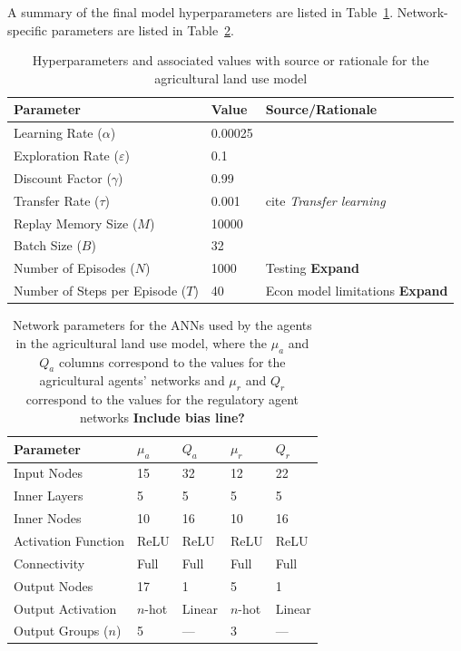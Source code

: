 A summary of the final model hyperparameters are listed in
Table~\ref{tab:farm_exp_hyper}.
Network-specific parameters are listed in Table~\ref{tab:farm_exp_nets}.

\begin{table}
\centering
\caption{Hyperparameters and associated values with source or rationale
    for the agricultural land use model}
\label{tab:farm_exp_hyper}
\begin{tabular}{lll}
\hline
Parameter & Value & Source/Rationale \\
\hline
    Learning Rate ($\alpha$) & 0.00025 & \\
    Exploration Rate ($\varepsilon$) & 0.1 & \\
    Discount Factor ($\gamma$) & 0.99 & \\
    Transfer Rate ($\tau$) & 0.001 & cite \emph{Transfer learning} \\
    Replay Memory Size ($M$) & 10000 & \\
    Batch Size ($B$) & 32 & \cite{ddqn16} \\
    Number of Episodes ($N$) & 1000 & Testing \textbf{Expand} \\
    Number of Steps per Episode ($T$) & 40 
    & Econ model limitations \textbf{Expand} \\
\hline
\end{tabular}
\end{table}

\begin{table}
\centering
\caption{Network parameters for the ANNs used by the agents in the agricultural
land use model, where the $\mu_a$ and $Q_a$ columns correspond to the values
for the agricultural agents' networks and $\mu_r$ and $Q_r$ 
correspond to the values for the regulatory agent networks
\textbf{Include bias line?}}
\label{tab:farm_exp_nets}
\begin{tabular}{lllll}
    \hline
    Parameter & $\mu_a$ & $Q_a$ & $\mu_r$ & $Q_r$ \\
    \hline
    Input Nodes & 15 & 32 & 12 & 22 \\
    Inner Layers & 5 & 5 & 5 & 5 \\
    Inner Nodes & 10 & 16 & 10 & 16 \\
    Activation Function & ReLU & ReLU & ReLU & ReLU \\
    Connectivity & Full & Full & Full & Full \\
    Output Nodes & 17 & 1 & 5 & 1 \\
    Output Activation & $n$-hot & Linear & $n$-hot & Linear \\
    Output Groups ($n$) & 5 & --- & 3 & --- \\
    \hline
\end{tabular}
\end{table}

